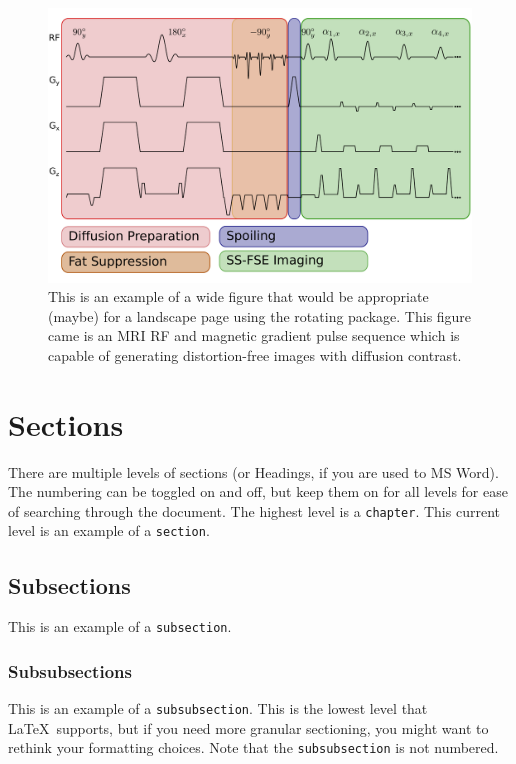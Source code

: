 \begin{figure}
  \centering
  \includegraphics[width=7in]{images/gibbons_sequence.pdf}
  \caption[A very wide figure using the rotating package.]{This is an example of a wide figure that would be appropriate (maybe) for a landscape page using the rotating package.  This figure came is an MRI RF and magnetic gradient pulse sequence which is capable of generating distortion-free images with diffusion contrast.}  
  \label{fig:wideFigRotating}
\end{figure}

\section{Sections}
\label{sec:sections}

There are multiple levels of sections (or Headings, if you are used to MS Word).  The numbering can be toggled on and off, but keep them on for all levels for ease of searching through the document.  The highest level is a \verb+chapter+.  This current level is an example of a \verb+section+.  

\subsection{Subsections}
\label{sec:subsections}

This is an example of a \verb+subsection+.

\subsubsection{Subsubsections}
\label{sec:subsubsections}

This is an example of a \verb+subsubsection+.  This is the lowest level that \LaTeX\ supports, but if you need more granular sectioning, you might want to rethink your formatting choices.  Note that the \verb+subsubsection+ is not numbered.  



